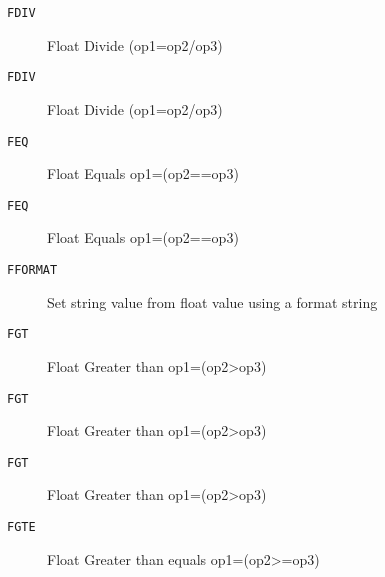
\begin{description}
\item[\texttt{FDIV       }]  Float Divide (op1=op2/op3)\\
\end{description}

\begin{description}
\item[\texttt{FDIV       }]  Float Divide (op1=op2/op3)\\
\end{description}

\begin{description}
\item[\texttt{FEQ        }]  Float Equals op1=(op2==op3)\\
\end{description}

\begin{description}
\item[\texttt{FEQ        }]  Float Equals op1=(op2==op3)\\
\end{description}

\begin{description}
\item[\texttt{FFORMAT    }]  Set string value from float value using a format string\\
\end{description}

\begin{description}
\item[\texttt{FGT        }]  Float Greater than op1=(op2>op3)\\
\end{description}

\begin{description}
\item[\texttt{FGT        }]  Float Greater than op1=(op2>op3)\\
\end{description}

\begin{description}
\item[\texttt{FGT        }]  Float Greater than op1=(op2>op3)\\
\end{description}

\begin{description}
\item[\texttt{FGTE       }]  Float Greater than equals op1=(op2>=op3)\\
\end{description}
